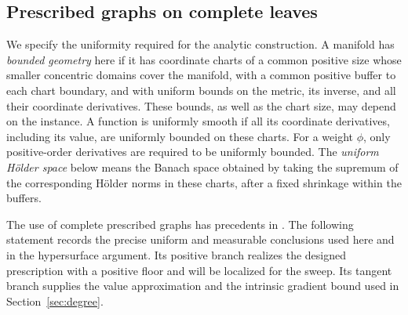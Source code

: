 \subsection{Prescribed graphs on complete leaves}

We specify the uniformity required for the analytic construction.
A manifold has \emph{bounded geometry} here if it has coordinate
charts of a common positive size whose smaller concentric domains
cover the manifold, with a common positive buffer to each chart
boundary, and with uniform bounds on the metric, its inverse, and
all their coordinate derivatives.  These bounds, as well as the
chart size, may depend on the instance.  A function is uniformly
smooth if all its coordinate derivatives, including its value, are
uniformly bounded on these charts.  For a weight \(\phi\), only
positive-order derivatives are required to be uniformly bounded.
The \emph{uniform Hölder space} below means the Banach space
obtained by taking the supremum of the corresponding Hölder norms in
these charts, after a fixed shrinkage within the buffers.

The use of complete prescribed graphs has precedents in
\cite[Theorem~5.2]{OpenAIScalarInessentiality2026}.  The
following statement records the precise uniform and measurable
conclusions used here and in the hypersurface argument.  Its positive
branch realizes the designed prescription with a positive floor and
will be localized for the sweep.  Its tangent branch supplies the value
approximation and the intrinsic gradient bound used in
Section~\ref{sec:degree}.

